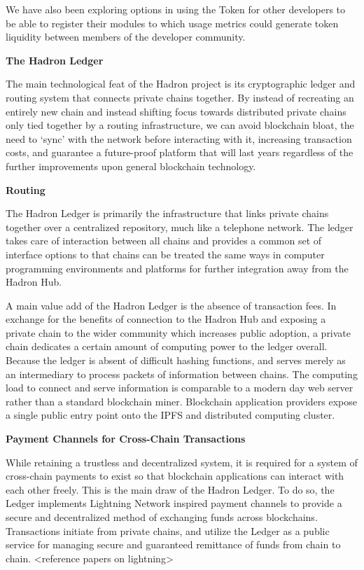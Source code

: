 \documentclass{%
	article}
\begin{document}
We have also been exploring options in using the Token for other developers to be able to register their modules to which usage metrics could generate token liquidity between members of the developer community.

\begin{center}
\textbf{The Hadron Ledger}
\end{center}

The main technological feat of the Hadron project is its cryptographic ledger and routing system that connects private chains together. By instead of recreating an entirely new chain and instead shifting focus towards distributed private chains only tied together by a routing infrastructure, we can avoid blockchain bloat, the need to ‘sync’ with the network before interacting with it, increasing transaction costs, and guarantee a future-proof platform that will last years regardless of the further improvements upon general blockchain technology.

\begin{center}
\textbf{Routing}
\end{center}

The Hadron Ledger is primarily the infrastructure that links private chains together over a centralized repository, much like a telephone network. The ledger takes care of interaction between all chains and provides a common set of interface options to that chains can be treated the same ways in computer programming environments and platforms for further integration away from the Hadron Hub.

A main value add of the Hadron Ledger is the absence of transaction fees. In exchange for the benefits of connection to the Hadron Hub and exposing a private chain to the wider community which increases public adoption, a private chain dedicates a certain amount of computing power to the ledger overall. Because the ledger is absent of difficult hashing functions, and serves merely as an intermediary to process packets of information between chains. The computing load to connect and serve information is comparable to a modern day web server rather than a standard blockchain miner. Blockchain application providers expose a single public entry point onto the IPFS and distributed computing cluster.

\begin{center}
\textbf{Payment Channels for Cross-Chain Transactions}
\end{center}

While retaining a trustless and decentralized system, it is required for a system of cross-chain payments to exist so that blockchain applications can interact with each other freely. This is the main draw of the Hadron Ledger. To do so, the Ledger implements Lightning Network inspired payment channels to provide a secure and decentralized method of exchanging funds across blockchains. Transactions initiate from private chains, and utilize the Ledger as a public service for managing secure and guaranteed remittance of funds from chain to chain. <reference papers on lightning>
\end{document}

